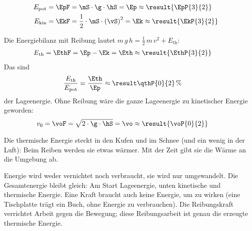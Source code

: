 \begin{abcliste}
\abc
\begin{align}
 E_\mathrm{pot} &= \EpF = \mS\cdot\g\cdot\hS = \Ep \approx \result{\EpP{3}{2}}\\
 E_\mathrm{kin} &= \EkF = \frac{1}{2}\cdot\mS\cdot\left(\vS\right)^2 = \Ek \approx \result{\EkP{3}{2}}
\end{align}

\abc
Die Energiebilanz mit Reibung lautet $m\,g\,h = \frac{1}{2}\,m\,v^2 + E_\mathrm{th}$:
\begin{align}
 E_\mathrm{th} &= \EthF = \Ep - \Ek = \Eth \approx \result{\EthP{3}{2}}
\end{align}
Das sind
\begin{align}
 \frac{E_\mathrm{th}}{E_\mathrm{pot}} &= \frac{\Eth}{\Ep} \approx \result{\qthP{0}{2}\,\%}
\end{align}
der Lageenergie. Ohne Reibung wäre die ganze Lageenergie zu kinetischer Energie geworden:
\begin{align}
 v_0 &= \voF = \sqrt{2\cdot\g\cdot\hS} = \vo \approx \result{\voP{0}{2}}
\end{align}

\abc
Die thermische Energie steckt in den Kufen und im Schnee (und ein wenig in der Luft): Beim Reiben werden sie etwas wärmer. Mit der Zeit gibt sie die Wärme an die Umgebung ab.

\abc
Energie wird weder vernichtet noch verbraucht, sie wird nur umgewandelt. Die Gesamtenergie bleibt gleich: Am Start  Lageenergie, unten  kinetische und  thermische Energie. Eine Kraft braucht auch keine Energie, um zu wirken (eine Tischplatte trägt ein Buch, ohne Energie zu verbrauchen). Die Reibungskraft verrichtet Arbeit gegen die Bewegung; diese Reibungsarbeit ist genau die erzeugte thermische Energie.
\end{abcliste}

